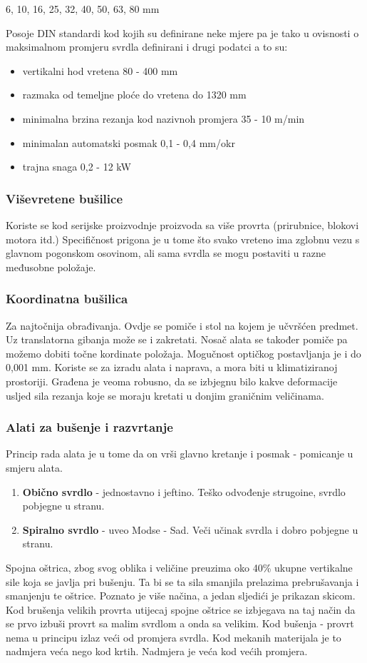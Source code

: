 \documentclass[a4paper,12pt]{article}
\numberwithin{figure}{section}
\begin{document}
\begin{center}
6, 10, 16, 25, 32, 40, 50, 63, 80 mm
\end{center}
Posoje DIN standardi kod kojih su definirane neke mjere pa je tako u ovisnosti o maksimalnom promjeru svrdla definirani i drugi podatci a to su:
\begin{itemize}
\item vertikalni hod vretena 80 - 400 mm
\item razmaka od temeljne ploće do vretena do 1320 mm
\item minimalna brzina rezanja kod nazivnoh promjera  35 - 10 m/min
\item minimalan automatski posmak 0,1 - 0,4 mm/okr
\item trajna snaga 0,2 - 12 kW
\end{itemize}
\subsubsection{Viševretene bušilice}
Koriste se kod serijske proizvodnje proizvoda sa više provrta (prirubnice, blokovi motora itd.) Specifičnost prigona je u tome što svako vreteno ima zglobnu vezu s glavnom pogonskom osovinom, ali sama svrdla se mogu postaviti u razne međusobne položaje.
\subsubsection{Koordinatna bušilica}
Za najtočnija obrađivanja. Ovdje se pomiče i stol na kojem je učvršćen predmet. Uz translatorna gibanja može se i zakretati. Nosač alata se također pomiče pa možemo dobiti točne kordinate položaja. Mogučnost optičkog postavljanja je i do 0,001 mm. Koriste se za izradu alata i naprava, a mora biti u klimatiziranoj prostoriji. Građena je veoma robusno, da se izbjegnu bilo kakve deformacije usljed sila rezanja koje se moraju kretati u donjim graničnim veličinama.
\subsubsection{Alati za bušenje i razvrtanje}
Princip rada alata je u tome da on vrši glavno kretanje i posmak - pomicanje u smjeru alata.
\begin{enumerate}
\item \textbf{Obično svrdlo} - jednostavno i jeftino. Teško odvođenje strugoine, svrdlo pobjegne u stranu.
\item \textbf{Spiralno svrdlo} - uveo Modse - Sad. Veči učinak svrdla i dobro pobjegne u stranu.
\end{enumerate}
Spojna oštrica, zbog svog oblika i veličine preuzima oko 40\% ukupne vertikalne sile koja se javlja pri bušenju. Ta bi se ta sila smanjila prelazima prebrušavanja i smanjenju te oštrice. Poznato je više načina, a jedan sljedići je prikazan skicom.
Kod brušenja velikih provrta utijecaj spojne oštrice se izbjegava na taj način da se prvo izbuši provrt sa malim svrdlom a onda sa velikim.
Kod bušenja - provrt nema u principu izlaz veći od promjera svrdla. Kod mekanih materijala je to nadmjera veća nego kod krtih. Nadmjera je veća kod većih promjera.
\end{document}

